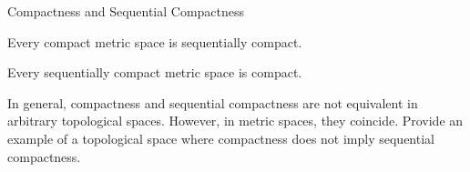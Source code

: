 \documentclass[12pt, a4paper]{article}
\begin{document}
\clearpage

\begin{heading}
    Compactness and Sequential Compactness
\end{heading}

\vspace{10pt}

\begin{theorem}
    Every compact metric space is sequentially compact.
\end{theorem}

\clearpage

\begin{theorem}
    Every sequentially compact metric space is compact.
\end{theorem}

\clearpage

\begin{problem}
    In general, compactness and sequential compactness are not equivalent in arbitrary topological spaces. However, in metric spaces, they coincide. Provide an example of a topological space where compactness does not imply sequential compactness.
\end{problem}




\EndPage
\end{document}
